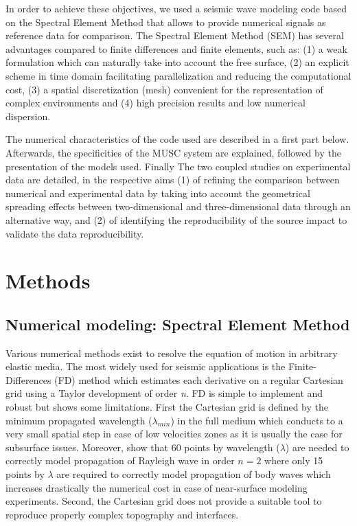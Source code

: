 \documentclass[manuscript,revised]{geophysics}
\newcommand{\twod}{two-dimensional }
\newcommand{\thrd}{three-dimensional }
\begin{document}
\noindent In order to achieve these objectives, we used a seismic wave modeling code based on the Spectral Element Method \citep{Komatitsch_SEM_1998,Komatitsch_ISM_1999,Komatitsch_SEM_2005,Festa_PML_2005} that allows to provide numerical signals as reference data for comparison. The Spectral Element Method (SEM) has several advantages compared to finite differences and finite elements, such as: (1) a weak formulation which can naturally take into account the free surface, (2) an explicit scheme in time domain facilitating parallelization and reducing the computational cost, (3) a spatial discretization (mesh) convenient for the representation of complex environments and (4) high precision results and low numerical dispersion.


\noindent The numerical characteristics of the code used are described in a first part below. Afterwards, the specificities of the MUSC system are explained, followed by the presentation of the models used. Finally The two coupled studies on experimental data are detailed, in the respective aims (1) of refining the comparison between numerical and experimental data by taking into account the geometrical spreading effects between \twod and \thrd data through an alternative way, and (2) of identifying the reproducibility of the source impact to validate the data reproducibility.


\section{Methods}

\subsection{Numerical modeling: Spectral Element Method}

\noindent Various numerical methods exist to resolve the equation of motion in arbitrary elastic media. The most widely used for seismic applications is the Finite-Differences (FD) method \citep{Virieux_PSV_1986,Levander_PSV_1988,Robertsson_FDM_1994,Pratt_EWM_1990,Stekl_VEM_1998,Saenger_FDM_2004} which estimates each derivative on a regular Cartesian grid using a Taylor development \citep{Moczo_FDM_2004} of order \textit{n}. FD is simple to implement and robust but shows some limitations. First the Cartesian grid is defined by the minimum propagated wavelength ($\lambda_{min}$) in the full medium which conducts to a very small spatial step in case of low velocities zones as it is usually the case for subsurface issues. Moreover, \citet{Saenger_FDM_2000} show that 60 points by wavelength ($\lambda$) are needed to correctly model propagation of Rayleigh wave in order $n=2$ where only 15 points by $\lambda$ are required to correctly model propagation of body waves which increases drastically the numerical cost in case of near-surface modeling experiments. Second, the Cartesian grid does not provide a suitable tool to reproduce properly complex topography and interfaces. 
\end{document}
